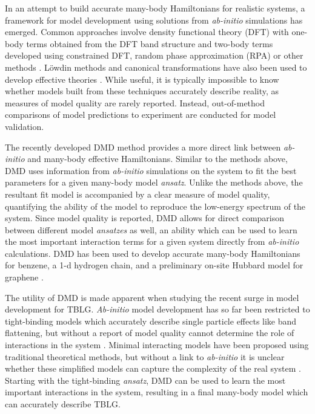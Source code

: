 \documentclass[12pt]{article}
\begin{document}
In an attempt to build accurate many-body Hamiltonians for realistic systems, a framework for model development using solutions from \textit{ab-initio} simulations has emerged.
Common approaches involve density functional theory (DFT) \cite{PhysRev.140.A1133} with one-body terms obtained from the DFT band structure \cite{PhysRevLett.87.047003} and two-body terms developed using constrained DFT, random phase approximation (RPA) or other methods \cite{PhysRevB.62.R16219, PhysRevB.70.195104, PhysRevB.88.075106}.
L\"owdin methods and canonical transformations have also been used to develop effective theories \cite{doi:10.1063/1.4802766, PhysRevA.81.013402, doi:10.1063/1.2196410}.
While useful, it is typically impossible to know whether models built from these techniques accurately describe reality, as measures of model quality are rarely reported.
Instead, out-of-method comparisons of model predictions to experiment are conducted for model validation.

The recently developed DMD \cite{Zheng2017} method provides a more direct link between \textit{ab-initio} and many-body effective Hamiltonians.
Similar to the methods above, DMD uses information from \textit{ab-initio} simulations on the system to fit the best parameters for a given many-body model \textit{ansatz}.
Unlike the methods above, the resultant fit model is accompanied by a clear measure of model quality, quantifying the ability of the model to reproduce the low-energy spectrum of the system.
Since model quality is reported, DMD allows for direct comparison between different model \textit{ansatzes} as well, an ability which can be used to learn the most important interaction terms for a given system directly from \textit{ab-initio} calculations.
DMD has been used to develop accurate many-body Hamiltonians for benzene, a 1-d hydrogen chain, and a preliminary on-site Hubbard model for graphene \cite{Zheng2017, Wagner2015}.

The utility of DMD is made apparent when studying the recent surge in model development for TBLG.
\textit{Ab-initio} model development has so far been restricted to tight-binding models which accurately describe single particle effects like band flattening, but without a report of model quality cannot determine the role of interactions in the system \cite{Fang, Fang2016, PhysRevX.8.031088, PhysRevX.8.031087}.
Minimal interacting models have been proposed using traditional theoretical methods, but without a link to \textit{ab-initio} it is unclear whether these simplified models can capture the complexity of the real system \cite{PhysRevB.98.045103, PhysRevB.100.125116, PhysRevX.8.031089}.
Starting with the tight-binding \textit{ansatz}, DMD can be used to learn the most important interactions in the system, resulting in a final many-body model which can accurately describe TBLG.
\end{document}

